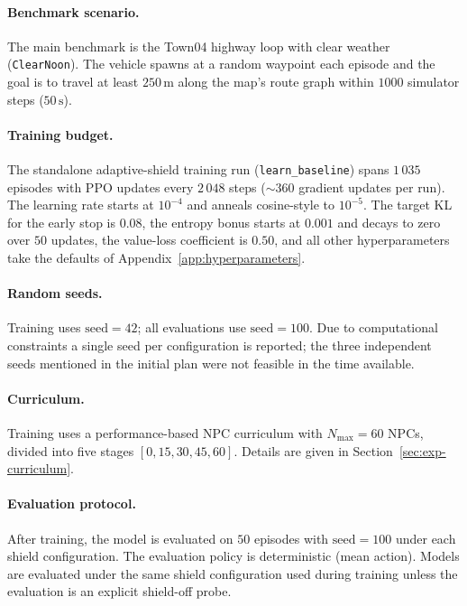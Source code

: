 \paragraph{Benchmark scenario.}
The main benchmark is the Town04 highway loop with clear weather (\texttt{ClearNoon}). The
vehicle spawns at a random waypoint each episode and the goal is to travel at least
\(250\,\mathrm{m}\) along the map's route graph within \(1000\) simulator steps
(\(50\,\mathrm{s}\)).

\paragraph{Training budget.}
The standalone adaptive-shield training run (\texttt{learn\_baseline}) spans
\(1\,035\) episodes with PPO updates every \(2\,048\) steps (\(\sim\!360\) gradient
updates per run). The learning rate starts at \(10^{-4}\) and anneals cosine-style to
\(10^{-5}\). The target KL for the early stop is \(0.08\), the entropy bonus starts at
\(0.001\) and decays to zero over \(50\) updates, the value-loss coefficient is \(0.50\),
and all other hyperparameters take the defaults of Appendix~\ref{app:hyperparameters}.

\paragraph{Random seeds.}
Training uses \(\mathrm{seed}=42\); all evaluations use \(\mathrm{seed}=100\). Due to
computational constraints a single seed per configuration is reported; the three
independent seeds mentioned in the initial plan were not feasible in the time available.

\paragraph{Curriculum.}
Training uses a performance-based NPC curriculum with \(N_{\max} = 60\) NPCs, divided into
five stages \([0, 15, 30, 45, 60]\). Details are given in Section~\ref{sec:exp-curriculum}.

\paragraph{Evaluation protocol.}
After training, the model is evaluated on \(50\) episodes with \(\mathrm{seed}=100\) under
each shield configuration. The evaluation policy is deterministic (mean action). Models
are evaluated under the same shield configuration used during training unless the
evaluation is an explicit shield-off probe.

